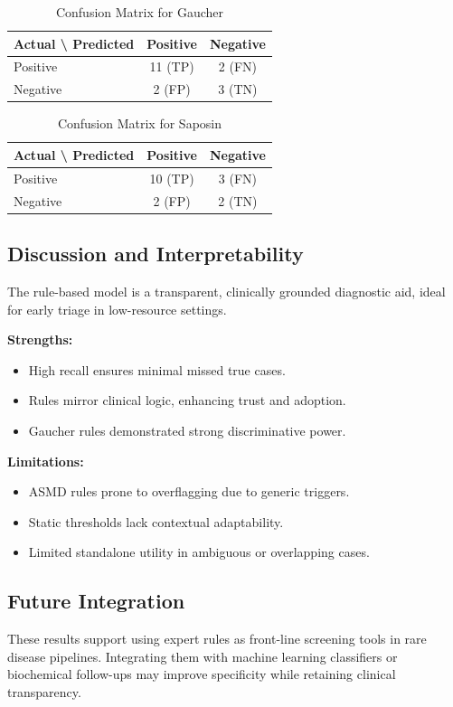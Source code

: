 \begin{table}[H]
\centering
\caption{Confusion Matrix for Gaucher}
\begin{tabular}{lcc}
\toprule
\textbf{Actual \textbackslash{} Predicted} & Positive & Negative \\
\midrule
Positive & 11 (TP) & 2 (FN) \\
Negative & 2 (FP) & 3 (TN) \\
\bottomrule
\end{tabular}
\end{table}

\begin{table}[H]
\centering
\caption{Confusion Matrix for Saposin}
\begin{tabular}{lcc}
\toprule
\textbf{Actual \textbackslash{} Predicted} & Positive & Negative \\
\midrule
Positive & 10 (TP) & 3 (FN) \\
Negative & 2 (FP) & 2 (TN) \\
\bottomrule
\end{tabular}
\end{table}

\subsection{Discussion and Interpretability}

The rule-based model is a transparent, clinically grounded diagnostic aid, ideal for early triage in low-resource settings.  

\textbf{Strengths:}  
\begin{itemize}
  \item High recall ensures minimal missed true cases.
  \item Rules mirror clinical logic, enhancing trust and adoption.
  \item Gaucher rules demonstrated strong discriminative power.
\end{itemize}

\textbf{Limitations:}  
\begin{itemize}
  \item ASMD rules prone to overflagging due to generic triggers.
  \item Static thresholds lack contextual adaptability.
  \item Limited standalone utility in ambiguous or overlapping cases.
\end{itemize}

\subsection{Future Integration}

These results support using expert rules as front-line screening tools in rare disease pipelines. Integrating them with machine learning classifiers or biochemical follow-ups may improve specificity while retaining clinical transparency.
